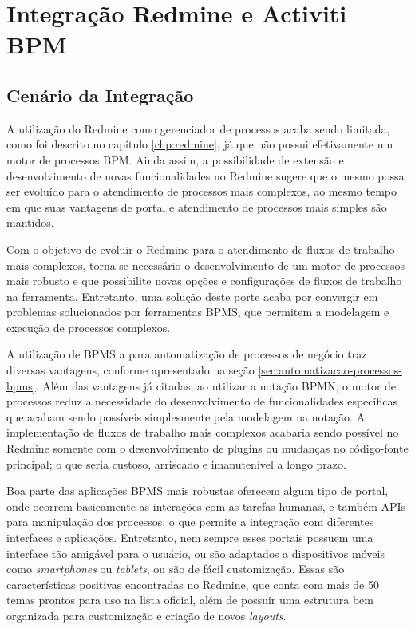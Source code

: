 \chapter{Integração Redmine e Activiti BPM}\label{chp:integracao_redmine_activiti}


\section{Cenário da Integração}\label{sec:cenario-integracao}

A utilização do Redmine como gerenciador de processos acaba sendo limitada, como foi descrito no capítulo \ref{chp:redmine}, já que não possui efetivamente um motor de processos BPM. Ainda assim, a possibilidade de extensão e desenvolvimento de novas funcionalidades no Redmine sugere que o mesmo possa ser evoluído para o atendimento de processos mais complexos, ao mesmo tempo em que suas vantagens de portal e atendimento de processos mais simples são mantidos.

Com o objetivo de evoluir o Redmine para o atendimento de fluxos de trabalho mais complexos, torna-se necessário o desenvolvimento de um motor de processos mais robusto e que possibilite novas opções e configurações de fluxos de trabalho na ferramenta. Entretanto, uma solução deste porte acaba por convergir em problemas solucionados por ferramentas BPMS, que permitem a modelagem e execução de processos complexos.

A utilização de BPMS a para automatização de processos de negócio traz diversas vantagens, conforme apresentado na seção \ref{sec:automatizacao-processos-bpms}. Além das vantagens já citadas, ao utilizar a notação BPMN, o motor de processos reduz a necessidade do desenvolvimento de funcionalidades específicas que acabam sendo possíveis simplesmente pela modelagem na notação. A implementação de fluxos de trabalho mais complexos acabaria sendo possível no Redmine somente com o desenvolvimento de plugins ou mudanças no código-fonte principal; o que seria custoso, arriscado e imanutenível a longo prazo.

Boa parte das aplicações BPMS mais robustas oferecem algum tipo de portal, onde ocorrem basicamente as interações com as tarefas humanas, e também APIs para manipulação dos processos, o que permite a integração com diferentes interfaces e aplicações. Entretanto, nem sempre esses portais possuem uma interface tão amigável para o usuário, ou são adaptados a dispositivos móveis como \textit{smartphones} ou \textit{tablets}, ou são de fácil customização. Essas são características positivas encontradas no Redmine, que conta com mais de 50 temas prontos para uso na lista oficial\cite{redmine_themes}, além de possuir uma estrutura bem organizada para customização e criação de novos \textit{layouts}. 

